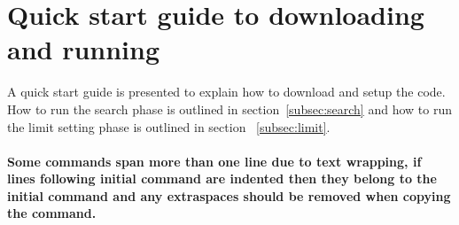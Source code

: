 \documentclass[UKenglish]{latex/atlasdoc}
\begin{document}
\section{Quick start guide to downloading and running }
\label{sec:quickstart}
A quick start guide is presented to explain how to download and setup the code. How to run the search phase is outlined in section~\ref{subsec:search} and how to run the limit setting phase is outlined in section ~\ref{subsec:limit}. 
\\\\\textbf{Some commands span more than one line due to text wrapping, if lines following initial command are indented then they belong to the initial command and any extraspaces should be removed when copying the command.}
\end{document}
